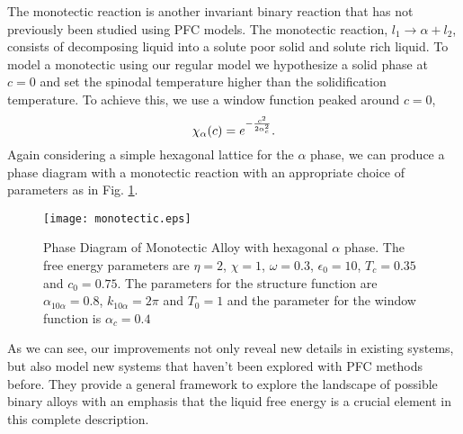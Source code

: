 The monotectic reaction is another invariant binary reaction that has not
previously been studied using PFC models. The monotectic reaction, $l_1
\rightarrow \alpha + l_2$, consists of decomposing liquid into a solute poor
solid and solute rich liquid. To model a monotectic using our regular model we
hypothesize a solid phase at $c=0$ and set the spinodal temperature higher
than the solidification temperature. To achieve this, we use a window function
peaked around $c = 0$,
%
\begin{equation}
    \chi_\alpha(c) = e^{-\frac{c^2}{2\alpha_c^2}}.
\end{equation}
%
Again considering a simple hexagonal lattice for the $\alpha$ phase, we can
produce a phase diagram with a monotectic reaction with an appropriate choice
of parameters as in Fig. \ref{monotectic}.

\begin{figure}
    \centering
	\texttt{[image: monotectic.eps]}
    \caption[Monotectic Phase Diagram]{
        \label{monotectic} Phase Diagram of Monotectic Alloy with hexagonal
        $\alpha$ phase. The free energy parameters are $\eta = 2$, $\chi=1$,
        $\omega=0.3$, $\epsilon_0 = 10$, $T_c = 0.35$ and $c_0 = 0.75$. The
        parameters for the structure function are $\alpha_{10\alpha} = 0.8$,
        $k_{10\alpha} = 2\pi$ and $T_0 = 1$ and the parameter for the window
        function is $\alpha_c = 0.4$
    }
\end{figure}

As we can see, our improvements not only reveal new details in existing
systems, but also model new systems that haven't been explored with PFC methods
before. They provide a general framework to explore the landscape of possible
binary alloys with an emphasis that the liquid free energy is a crucial element
in this complete description.

